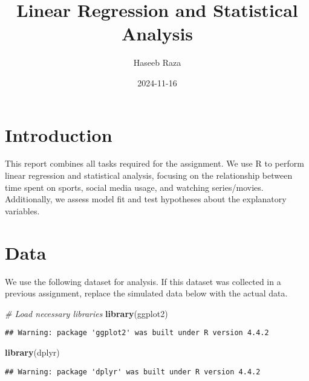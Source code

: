 \documentclass[
]{article}
\title{Linear Regression and Statistical Analysis}
\author{Haseeb Raza}
\date{2024-11-16}
\newenvironment{Shaded}{\begin{snugshade}}{\end{snugshade}}
\newcommand{\CommentTok}[1]{\textcolor[rgb]{0.56,0.35,0.01}{\textit{#1}}}
\newcommand{\FunctionTok}[1]{\textcolor[rgb]{0.13,0.29,0.53}{\textbf{#1}}}
\newcommand{\NormalTok}[1]{#1}
\begin{document}
\maketitle

\section{Introduction}\label{introduction}

This report combines all tasks required for the assignment. We use R to
perform linear regression and statistical analysis, focusing on the
relationship between time spent on sports, social media usage, and
watching series/movies. Additionally, we assess model fit and test
hypotheses about the explanatory variables.

\section{Data}\label{data}

We use the following dataset for analysis. If this dataset was collected
in a previous assignment, replace the simulated data below with the
actual data.

\begin{Shaded}
\begin{Highlighting}[]
\CommentTok{\# Load necessary libraries}
\FunctionTok{library}\NormalTok{(ggplot2)}
\end{Highlighting}
\end{Shaded}

\begin{verbatim}
## Warning: package 'ggplot2' was built under R version 4.4.2
\end{verbatim}

\begin{Shaded}
\begin{Highlighting}[]
\FunctionTok{library}\NormalTok{(dplyr)}
\end{Highlighting}
\end{Shaded}

\begin{verbatim}
## Warning: package 'dplyr' was built under R version 4.4.2
\end{verbatim}
\end{document}
